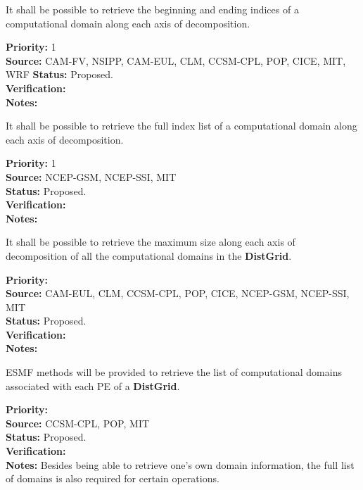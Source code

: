 
It shall be possible to retrieve the beginning and ending indices of a
computational domain along each axis of decomposition.

\begin{reqlist}
{\bf Priority:} 1 \\ 
{\bf Source:} CAM-FV, NSIPP, CAM-EUL, CLM, CCSM-CPL, POP, CICE, MIT, WRF
{\bf Status:} Proposed. \\
{\bf Verification:} \\
{\bf Notes:}
\end{reqlist}


It shall be possible to retrieve the full index list of a
computational domain along each axis of decomposition.

\begin{reqlist}
{\bf Priority:} 1 \\ 
{\bf Source:} NCEP-GSM, NCEP-SSI, MIT \\
{\bf Status:} Proposed. \\
{\bf Verification:} \\
{\bf Notes:}
\end{reqlist}


It shall be possible to retrieve the maximum size along each axis of
decomposition of all the computational domains in the \textbf{DistGrid}. 

\begin{reqlist}
{\bf Priority:} \\ 
{\bf Source:} CAM-EUL, CLM, CCSM-CPL, POP, CICE, NCEP-GSM, NCEP-SSI, MIT \\
{\bf Status:} Proposed. \\
{\bf Verification:} \\
{\bf Notes:}
\end{reqlist}


ESMF methods will be provided to retrieve the list of computational
domains associated with each PE of a  \textbf{DistGrid}.

\begin{reqlist}
{\bf Priority:} \\ 
{\bf Source:} CCSM-CPL, POP, MIT \\
{\bf Status:} Proposed. \\
{\bf Verification:} \\
{\bf Notes:} Besides being able to retrieve one's own domain
  information, the full list of domains is also required for certain
  operations.
\end{reqlist}

